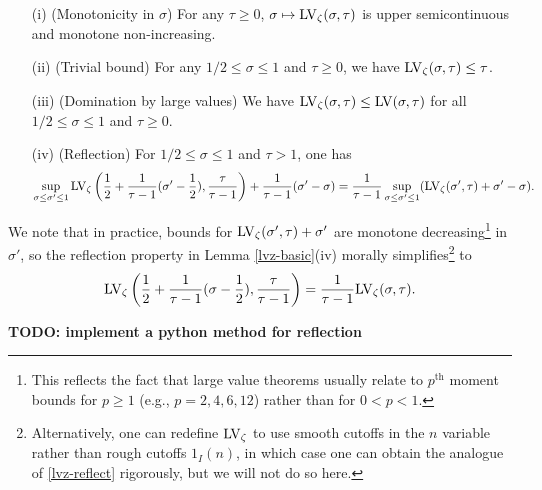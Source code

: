 \begin{lemma}\label{lvz-basic}
    \begin{itemize}
        \item[(i)] (Monotonicity in $\sigma$) For any $\tau \geq 0$, $\sigma \mapsto \mathrm{LV}_\zeta(\sigma,\tau)$ is upper semicontinuous and monotone non-increasing.
        \item[(ii)] (Trivial bound) For any $1/2 \leq \sigma \leq 1$ and $\tau \geq 0$, we have $\mathrm{LV}_\zeta(\sigma,\tau) \leq \tau$.
        \item[(iii)] (Domination by large values)  We have $\mathrm{LV}_\zeta(\sigma,\tau) \leq \mathrm{LV}(\sigma,\tau)$ for all $1/2 \leq \sigma \leq 1$ and $\tau \geq 0$.
        \item[(iv)] (Reflection) For $1/2 \leq \sigma \leq 1$ and $\tau > 1$, one has
              $$ \sup_{\sigma \leq \sigma' \leq 1} \mathrm{LV}_\zeta\left(\frac{1}{2} + \frac{1}{\tau-1} (\sigma'-\frac{1}{2}), \frac{\tau}{\tau-1}\right) + \frac{1}{\tau-1} (\sigma'-\sigma) = \frac{1}{\tau-1} \sup_{\sigma \leq \sigma' \leq 1} (\mathrm{LV}_\zeta(\sigma',\tau) + \sigma'-\sigma).$$
    \end{itemize}
\end{lemma}


We note that in practice, bounds for $\mathrm{LV}_\zeta(\sigma',\tau)+\sigma'$ are monotone decreasing\footnote{This reflects the fact that large value theorems usually relate to $p^{\mathrm{th}}$ moment bounds for $p \geq 1$ (e.g., $p = 2, 4, 6, 12$) rather than for $0 < p < 1$.} in $\sigma'$, so the reflection property in Lemma \ref{lvz-basic}(iv) morally simplifies\footnote{Alternatively, one can redefine $\mathrm{LV}_\zeta$ to use smooth cutoffs in the $n$ variable rather than rough cutoffs $1_I(n)$, in which case one can obtain the analogue of \eqref{lvz-reflect} rigorously, but we will not do so here.} to
\begin{equation}\label{lvz-reflect}
    \mathrm{LV}_\zeta\left(\frac{1}{2} + \frac{1}{\tau-1} (\sigma-\frac{1}{2}), \frac{\tau}{\tau-1}\right) = \frac{1}{\tau-1} \mathrm{LV}_\zeta(\sigma,\tau).
\end{equation}

{\bf TODO: implement a python method for reflection}

